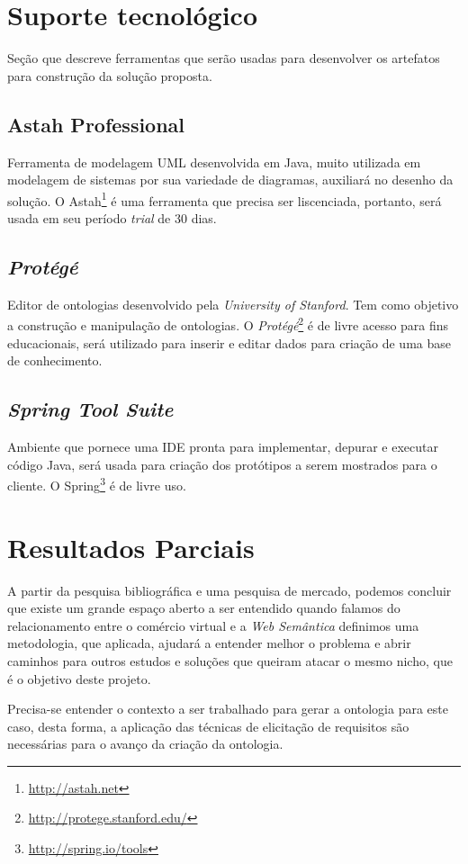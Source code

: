 \section{Suporte tecnológico}

Seção que descreve ferramentas que serão usadas para desenvolver os artefatos para construção da solução proposta.

\subsection{Astah Professional}

Ferramenta de modelagem UML desenvolvida em Java, muito utilizada em modelagem de sistemas por sua variedade de diagramas, auxiliará no desenho da solução. O Astah\footnote{\url{http://astah.net}} é uma ferramenta que precisa ser liscenciada, portanto, será usada em seu período \textit{trial} de 30 dias.

\subsection{\textit{Protégé}}

Editor de ontologias desenvolvido pela \textit{University of Stanford}. Tem como objetivo a construção e manipulação de ontologias. O \textit{Protégé}\footnote{\url{http://protege.stanford.edu/}} é de livre acesso para fins educacionais, será utilizado para inserir e editar dados para criação de uma base de conhecimento.

\subsection{\textit{Spring Tool Suite}}

Ambiente que pornece uma IDE pronta para implementar, depurar e executar código Java, será usada para criação dos protótipos a serem mostrados para o cliente. O Spring\footnote{\url{http://spring.io/tools}} é de livre uso.

\section{Resultados Parciais}

A partir da pesquisa bibliográfica e uma pesquisa de mercado, podemos concluir que existe um grande espaço aberto a ser entendido quando falamos do relacionamento entre o comércio virtual e a \textit{Web Semântica} definimos uma metodologia, que aplicada, ajudará a entender melhor o problema e abrir caminhos para outros estudos e soluções que queiram atacar o mesmo nicho, que é o objetivo deste projeto.

Precisa-se entender o contexto a ser trabalhado para gerar a ontologia para este caso, desta forma, a aplicação das técnicas de elicitação de requisitos são necessárias para o avanço da criação da ontologia.

